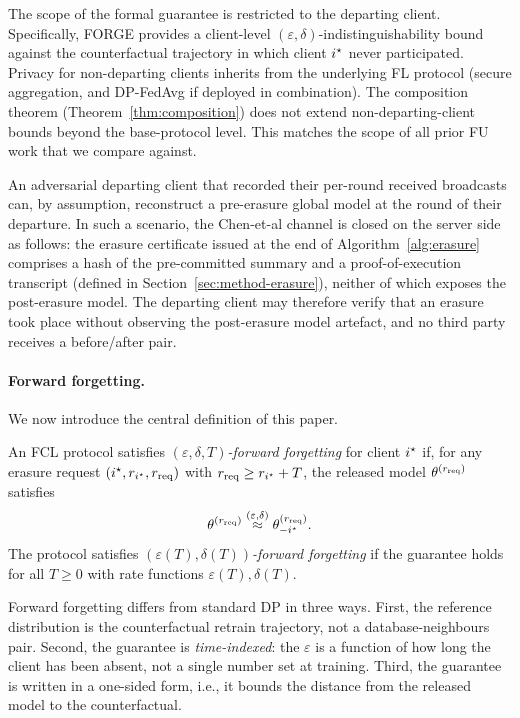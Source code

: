 The scope of the formal guarantee is restricted to the departing client. Specifically,
FORGE provides a client-level $(\varepsilon, \delta)$-indistinguishability bound against
the counterfactual trajectory in which client $i^{\star}$ never participated. Privacy for
non-departing clients inherits from the underlying FL protocol (secure aggregation, and
DP-FedAvg \cite{mcmahan2018learning} if deployed in combination). The composition
theorem (Theorem~\ref{thm:composition}) does not extend non-departing-client bounds
beyond the base-protocol level. This matches the scope of all prior FU work that we
compare against.

An adversarial departing client that recorded their per-round received broadcasts can,
by assumption, reconstruct a pre-erasure global model at the round of their departure.
In such a scenario, the Chen-et-al channel \cite{chen2021unlearningleaks} is closed on
the server side as follows: the erasure certificate issued at the end of
Algorithm~\ref{alg:erasure} comprises a hash of the pre-committed summary and a
proof-of-execution transcript (defined in Section~\ref{sec:method-erasure}), neither of
which exposes the post-erasure model. The departing client may therefore verify that
an erasure took place without observing the post-erasure model artefact, and no third
party receives a before/after pair.

\paragraph{Forward forgetting.}
We now introduce the central definition of this paper.

\begin{definition}
\label{def:forward-forgetting}
An FCL protocol satisfies \emph{$(\varepsilon, \delta, T)$-forward forgetting} for
client $i^{\star}$ if, for any erasure request $(i^{\star}, r_{i^{\star}}, r_{\mathrm{req}})$
with $r_{\mathrm{req}} \geq r_{i^{\star}} + T$, the released model
$\theta^{(r_{\mathrm{req}})}$ satisfies
\begin{equation}
\theta^{(r_{\mathrm{req}})} \stackrel{(\varepsilon,\delta)}{\approx} \theta_{-i^{\star}}^{(r_{\mathrm{req}})}.
\end{equation}
The protocol satisfies \emph{$(\varepsilon(T), \delta(T))$-forward forgetting} if the
guarantee holds for all $T \geq 0$ with rate functions $\varepsilon(T), \delta(T)$.
\end{definition}

Forward forgetting differs from standard DP in three ways. First, the reference
distribution is the counterfactual retrain trajectory, not a database-neighbours pair.
Second, the guarantee is \emph{time-indexed}: the $\varepsilon$ is a function of how
long the client has been absent, not a single number set at training. Third, the
guarantee is written in a one-sided form, i.e., it bounds the distance from the
released model to the counterfactual.


